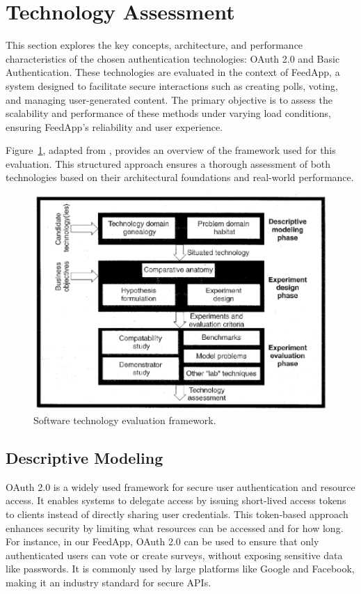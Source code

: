 \section{Technology Assessment}
\label{sec:technology}

This section explores the key concepts, architecture, and performance characteristics of the chosen authentication technologies: OAuth 2.0 and Basic Authentication. These technologies are evaluated in the context of FeedApp, a system designed to facilitate secure interactions such as creating polls, voting, and managing user-generated content. The primary objective is to assess the scalability and performance of these methods under varying load conditions, ensuring FeedApp's reliability and user experience.

Figure~\ref{fig:framework}, adapted from \cite{brown:96}, provides an overview of the framework used for this evaluation. This structured approach ensures a thorough assessment of both technologies based on their architectural foundations and real-world performance.

\begin{figure}[thb]
	\centering
	\includegraphics[scale=0.5]{figs/framework.png}
	\caption{Software technology evaluation framework.}
	\label{fig:framework}
\end{figure}

\subsection{Descriptive Modeling}
OAuth 2.0 is a widely used framework for secure user authentication and resource access. It enables systems to delegate access by issuing short-lived access tokens to clients instead of directly sharing user credentials. This token-based approach enhances security by limiting what resources can be accessed and for how long. For instance, in our FeedApp, OAuth 2.0 can be used to ensure that only authenticated users can vote or create surveys, without exposing sensitive data like passwords. It is commonly used by large platforms like Google and Facebook, making it an industry standard for secure APIs.

